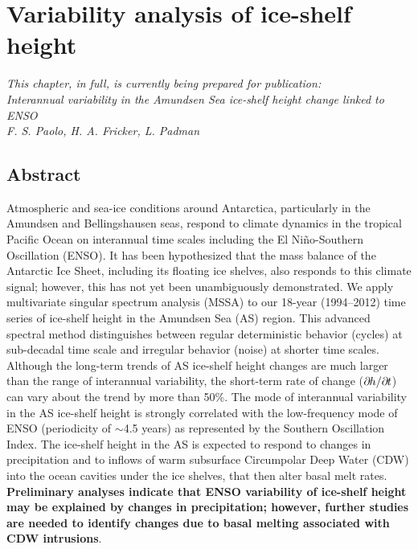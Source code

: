 


\chapter{Variability analysis of ice-shelf height}


{\sl
\noindent
This chapter, in full, is currently being prepared for publication:\\
Interannual variability in the Amundsen Sea ice-shelf height change linked to ENSO\\
F. S. Paolo, H. A. Fricker, L. Padman\\
}

\section{Abstract}

\noindent
Atmospheric and sea-ice conditions around Antarctica, particularly in the Amundsen and Bellingshausen seas, respond to climate dynamics in the tropical Pacific Ocean on interannual time scales including the El Ni\~no-Southern Oscillation (ENSO). It has been hypothesized that the mass balance of the Antarctic Ice Sheet, including its floating ice shelves, also responds to this climate signal; however, this has not yet been unambiguously demonstrated. We apply multivariate singular spectrum analysis (MSSA) to our 18-year (1994--2012) time series of ice-shelf height in the Amundsen Sea (AS) region. This advanced spectral method distinguishes between regular deterministic behavior (cycles) at sub-decadal time scale and irregular behavior (noise) at shorter time scales. Although the long-term trends of AS ice-shelf height changes are much larger than the range of interannual variability, the short-term rate of change ($\partial\mkern-1.5mu h/\partial\mkern-1.5mu t$) can vary about the trend by more than 50\%. The mode of interannual variability in the AS ice-shelf height is strongly correlated with the low-frequency mode of ENSO (periodicity of $\sim$4.5 years) as represented by the Southern Oscillation Index. The ice-shelf height in the AS is expected to respond to changes in precipitation and to inflows of warm subsurface Circumpolar Deep Water (CDW) into the ocean cavities under the ice shelves, that then alter basal melt rates. {\bf Preliminary analyses indicate that ENSO variability of ice-shelf height may be explained by changes in precipitation; however, further studies are needed to identify changes due to basal melting associated with CDW intrusions}.

